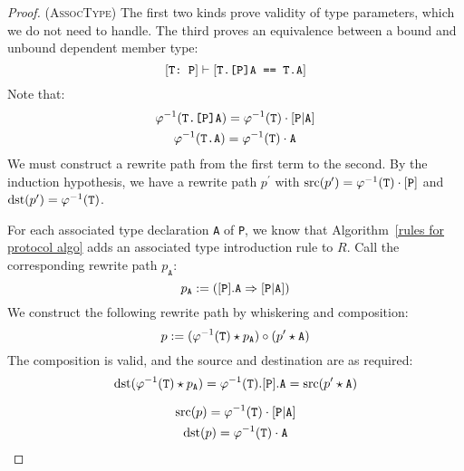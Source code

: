\documentclass[../generics]{subfiles}
\begin{document}
\begin{proof}
(\textsc{AssocType})
The first two kinds prove validity of type parameters, which we do not need to handle. The third proves an equivalence between a bound and unbound dependent member type:
\[[\texttt{T:~P}]\vdash[\texttt{T.[P]A == T.A}]\]
Note that:
\begin{gather*}
\varphi^{-1}(\texttt{T.[P]A})=\varphi^{-1}(\texttt{T})\cdot[\texttt{P}|\texttt{A}]\\
\varphi^{-1}(\texttt{T.A})=\varphi^{-1}(\texttt{T})\cdot\texttt{A}
\end{gather*}
We must construct a rewrite path from the first term to the second. By the induction hypothesis, we have a rewrite path $p^\prime$ with $\operatorname{src}(p^\prime)=\varphi^{-1}(\texttt{T})\cdot[\texttt{P}]$ and $\operatorname{dst}(p^\prime)=\varphi^{-1}(\texttt{T})$.

For each associated type declaration \texttt{A} of \texttt{P}, we know that Algorithm~\ref{rules for protocol algo} adds an associated type introduction rule to $R$. Call the corresponding rewrite path $p_\texttt{A}$:
\[p_\texttt{A}:=([\texttt{P}].\texttt{A}\Rightarrow[\texttt{P}|\texttt{A}])\]
We construct the following rewrite path by whiskering and composition:
\[p:=(\varphi^{-1}(\texttt{T})\star p_\texttt{A})\circ(p^\prime \star \texttt{A})\]
The composition is valid, and the source and destination are as required:
\begin{gather*}
\operatorname{dst}(\varphi^{-1}(\texttt{T})\star p_\texttt{A})=\varphi^{-1}(\texttt{T}).[\texttt{P}].\texttt{A}=\operatorname{src}(p^\prime \star \texttt{A})\\[\medskipamount]
\operatorname{src}(p)=\varphi^{-1}(\texttt{T})\cdot[\texttt{P}|\texttt{A}]\\
\operatorname{dst}(p)=\varphi^{-1}(\texttt{T})\cdot\texttt{A}
\end{gather*}


\end{proof}
\end{document}
